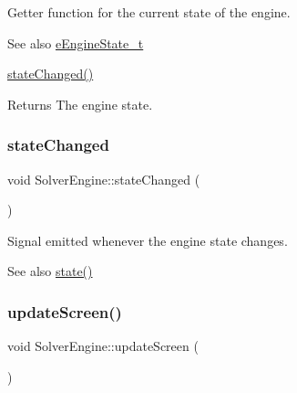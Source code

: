 Getter function for the current state of the engine. 

\begin{DoxySeeAlso}{See also}
\mbox{\hyperlink{class_solver_engine_acd25f3521e492d4aa924f922396bf02c}{e\+Engine\+State\+\_\+t}} 

\mbox{\hyperlink{class_solver_engine_a73fd20671c169def4c85c53a2102e920}{state\+Changed()}} 
\end{DoxySeeAlso}
\begin{DoxyReturn}{Returns}
The engine state. 
\end{DoxyReturn}
\mbox{\label{class_solver_engine_a73fd20671c169def4c85c53a2102e920}} 
\subsubsection{\texorpdfstring{state\+Changed}{stateChanged}}
{\footnotesize\ttfamily void Solver\+Engine\+::state\+Changed (\begin{DoxyParamCaption}{ }\end{DoxyParamCaption})\hspace{0.3cm}{\ttfamily [signal]}}



Signal emitted whenever the engine state changes. 

\begin{DoxySeeAlso}{See also}
\mbox{\hyperlink{class_solver_engine_a6ac564f91cd5c523ece2c561a37b8263}{state()}} 
\end{DoxySeeAlso}
\mbox{\label{class_solver_engine_a24a236b02f997c594c259d15167e32d1}} 
\subsubsection{\texorpdfstring{update\+Screen()}{updateScreen()}}
{\footnotesize\ttfamily void Solver\+Engine\+::update\+Screen (\begin{DoxyParamCaption}{ }\end{DoxyParamCaption})\hspace{0.3cm}{\ttfamily [private]}}



